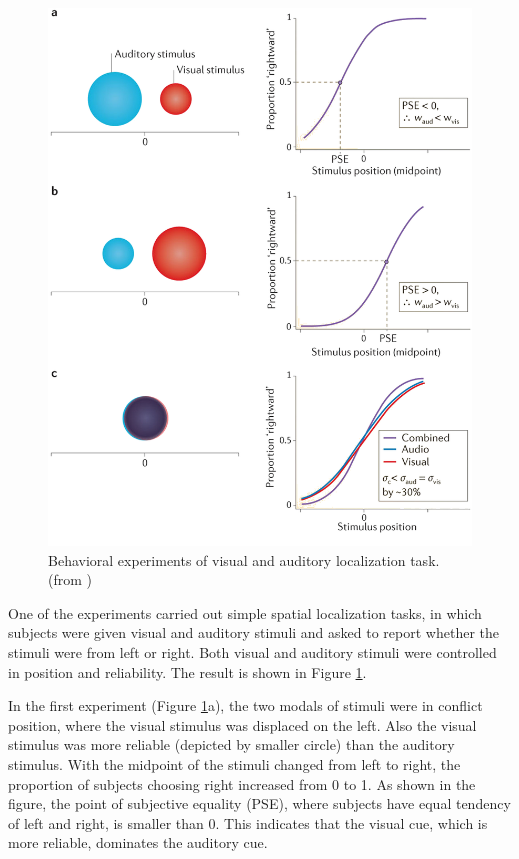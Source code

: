 \documentclass{article}[11pt]
\begin{document}
\begin{figure}[tpbh]
  \centering
  \includegraphics[width=.9\textwidth]{fetsch-visaudloc}
  \caption{Behavioral experiments of visual and auditory localization task. (from \cite{fetsch_bridging_2013})}
  \label{fig:visaudloc}
\end{figure}

One of the experiments \cite{alais_ventriloquist_2004} carried out simple spatial localization tasks, in which subjects were given visual and auditory stimuli and asked to report whether the stimuli were from left or right. Both visual and auditory stimuli were controlled in position and reliability. The result is shown in Figure \ref{fig:visaudloc}.

In the first experiment (Figure \ref{fig:visaudloc}a), the two modals of stimuli were in conflict position, where the visual stimulus was displaced on the left. Also the visual stimulus was more reliable (depicted by smaller circle) than the auditory stimulus. With the midpoint of the stimuli changed from left to right, the proportion of subjects choosing right increased from 0 to 1. As shown in the figure, the point of subjective equality (PSE), where subjects have equal tendency of left and right, is smaller than 0. This indicates that the visual cue, which is more reliable, dominates the auditory cue.
\end{document}
